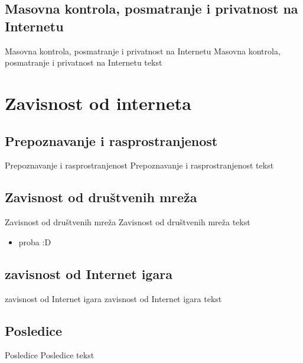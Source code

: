 \documentclass{beamer}
\begin{document}
		\subsection*{Masovna kontrola, posmatranje i privatnost na Internetu}
			\begin{frame}{Masovna kontrola, posmatranje i privatnost na Internetu}
				Masovna kontrola, posmatranje i privatnost na Internetu tekst
			\end{frame}
		
	\section{Zavisnost od interneta}
		\subsection*{Prepoznavanje i rasprostranjenost}
		\begin{frame}{Prepoznavanje i rasprostranjenost}
				Prepoznavanje i rasprostranjenost tekst
		\end{frame}
	
		\subsection*{Zavisnost od društvenih mreža}
			\begin{frame}{Zavisnost od društvenih mreža}
			Zavisnost od društvenih mreža tekst
				\begin{itemize}
				\item proba :D
				\end{itemize}
			\end{frame}
		\subsection*{zavisnost od Internet igara}
		\begin{frame}{zavisnost od Internet igara}
			zavisnost od Internet igara tekst
		\end{frame}
		
		\subsection*{Posledice}
		\begin{frame}{Posledice}
			Posledice tekst
		\end{frame}
		
	
\end{document}
